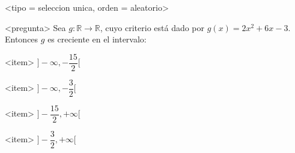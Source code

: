 <tipo = seleccion unica, orden = aleatorio>

<pregunta>
Sea $g:\mathbb R \to \mathbb R$, cuyo criterio est\'a dado por $g(x) = 2x^2 +6x -3$. Entonces $g$ es creciente en el intervalo:


<item>
$\bigg]{-}\infty, -\dfrac{15}{2}\bigg[$

<item>
$\bigg]{-}\infty, -\dfrac{3}{2}\bigg[$

<item>
$\bigg]-\dfrac{15}{2}, +\infty\bigg[$

<item>
$\bigg]-\dfrac{3}{2}, +\infty\bigg[$




